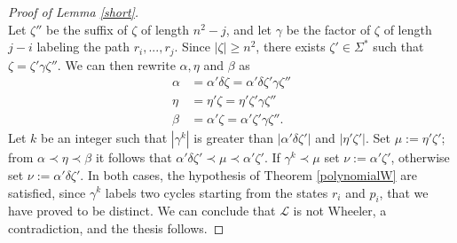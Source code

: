 \documentclass[runningheads]{llncs}
\begin{document}
\begin{proof}[\noindent Proof of Lemma \ref{short}]
\\Let $\zeta''$ be the suffix of $\zeta$ of length $n^2-j$, and let $\gamma$ be the factor of $\zeta$ of length $j-i$ labeling the path $r_i,...,r_j$. Since $|\zeta| \ge n^2$, there exists $\zeta' \in \Sigma^*$ such that $\zeta = \zeta' \gamma \zeta''$. We can then rewrite $\alpha, \eta$ and $\beta$ as
\begin{align*}
    \alpha &= \alpha' \delta \zeta = \alpha' \delta \zeta' \gamma \zeta'' \\
    \eta &= \eta' \zeta = \eta' \zeta' \gamma \zeta'' \\
    \beta &= \alpha' \zeta = \alpha' \zeta' \gamma \zeta''.
\end{align*}
Let $k$ be an integer such that $|\gamma^k|$ is greater than $|\alpha' \delta \zeta'|$ and $|\eta' \zeta'|$. Set $\mu := \eta' \zeta'$; from $\alpha \prec \eta \prec \beta$ it follows that $\alpha' \delta \zeta' \prec \mu \prec \alpha' \zeta'$. If $\gamma^k \prec \mu$ set $\nu := \alpha' \zeta'$, otherwise set $\nu := \alpha' \delta \zeta'$. In both cases, the hypothesis of Theorem \ref{polynomialW} are satisfied, since $\gamma^k$ labels two cycles starting from the states $r_i$ and $p_i$, that we have proved to be distinct. We can conclude that $\mathcal L$ is not Wheeler, a contradiction, and the thesis follows. 
\end{proof}

\vskip5mm
\end{document}
